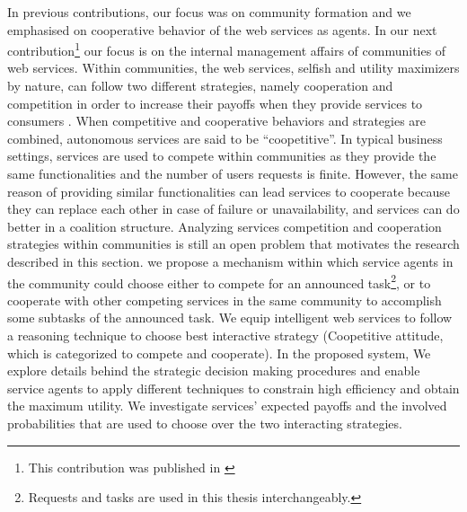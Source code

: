 In previous contributions, our focus was on community formation and we emphasised on cooperative behavior of the web services as agents. In our next contribution\footnote{This contribution was published in \cite{DBLP:journals/eswa/AslBMKO14}} our focus is on the internal management affairs of communities of web services. Within communities, the web services, selfish and utility maximizers by nature, can follow two different strategies, namely cooperation and competition in order to increase their payoffs when they provide services to consumers \cite{VuFind-10008938119}. When competitive and cooperative behaviors and strategies are combined, autonomous services are said to be ``coopetitive''. In typical business settings, services are used to compete within communities as they provide the same functionalities and the number of users requests is finite. However, the same reason of providing similar functionalities can lead services to cooperate because they can replace each other in case of failure or unavailability, and services can do better in a coalition structure. Analyzing services competition and cooperation strategies within communities is still an open problem that motivates the research described in this section. we propose a mechanism within which service agents
in the community could choose either to compete for an announced task\footnote{Requests and tasks are used in this thesis interchangeably.}, or to cooperate with other competing services in the same community to accomplish some subtasks of the announced task. We equip intelligent web services to follow a reasoning technique to choose best interactive strategy (Coopetitive attitude, which is categorized to compete and cooperate). In the proposed system, We explore details behind the strategic decision making procedures and enable service agents to apply different techniques to constrain high efficiency and obtain the maximum utility. We investigate services' expected payoffs and the involved probabilities that are used to choose over the two interacting strategies.



